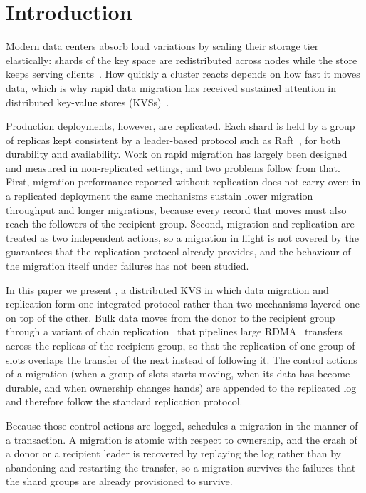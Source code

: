 \section{Introduction}
\label{sec:introduction}

Modern data centers absorb load variations by scaling their storage tier elastically:
shards of the key space are redistributed across nodes while the store keeps serving
clients~\cite{slicer,shard-manager,akkio}.
How quickly a cluster reacts depends on how fast it moves data, which is why rapid data
migration has received sustained attention in distributed key-value stores
(KVSs)~\cite{rocksteady,netmigrate}.

Production deployments, however, are replicated.
Each shard is held by a group of replicas kept consistent by a leader-based protocol such
as Raft~\cite{raft,paxos-simple}, for both durability and availability.
Work on rapid migration has largely been designed and measured in non-replicated
settings, and two problems follow from that.
First, migration performance reported without replication does not carry over: in a
replicated deployment the same mechanisms sustain lower migration throughput and longer
migrations, because every record that moves must also reach the followers of the recipient
group.
Second, migration and replication are treated as two independent actions, so a migration
in flight is not covered by the guarantees that the replication protocol already provides,
and the behaviour of the migration itself under failures has not been studied.

In this paper we present \OurImplementation{}, a distributed KVS in which data migration
and replication form one integrated protocol rather than two mechanisms layered one on top
of the other.
Bulk data moves from the donor to the recipient group through a variant of chain
replication~\cite{chain-replication} that pipelines large RDMA~\cite{Infiniband-spec}
transfers across the replicas of the recipient group, so that the replication of one group
of slots overlaps the transfer of the next instead of following it.
The control actions of a migration (when a group of slots starts moving, when its data
has become durable, and when ownership changes hands) are appended to the replicated log
and therefore follow the standard replication protocol.

Because those control actions are logged, \OurImplementation{} schedules a migration in
the manner of a transaction.
A migration is atomic with respect to ownership, and the crash of a donor or a recipient
leader is recovered by replaying the log rather than by abandoning and restarting the
transfer, so a migration survives the failures that the shard groups are already
provisioned to survive.

